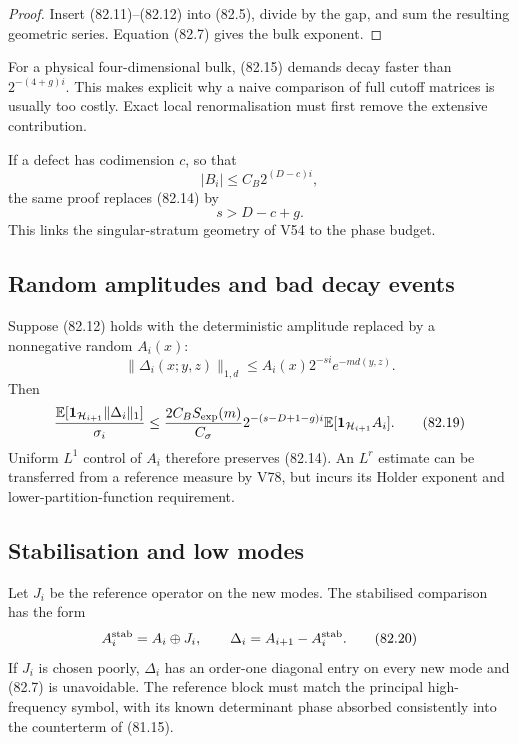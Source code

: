 \documentclass[11pt]{article}
\begin{document}
\begin{proof}
Insert (82.11)--(82.12) into (82.5), divide by the gap, and sum the
resulting geometric series.  Equation (82.7) gives the bulk exponent.
\end{proof}

For a physical four-dimensional bulk, (82.15) demands decay faster
than \(2^{-(4+g)i}\).  This makes explicit why a naive comparison of
full cutoff matrices is usually too costly.  Exact local
renormalisation must first remove the extensive contribution.

If a defect has codimension \(c\), so that
\[
                              |B_i|\le C_B2^{(D-c)i},         \tag{82.16}
\]
the same proof replaces (82.14) by
\[
                              s>D-c+g.                       \tag{82.17}
\]
This links the singular-stratum geometry of V54 to the phase budget.

\subsection{Random amplitudes and bad decay events}

Suppose (82.12) holds with the deterministic amplitude replaced by a
nonnegative random \(A_i(x)\):
\[
 \|\Delta_i(x;y,z)\|_{1,d}
       \le A_i(x)2^{-si}e^{-m d(y,z)}.                       \tag{82.18}
\]
Then
\[
 {\mathbb E[
 {\bf1}_{{\cal H}_{i+1}}\|\Delta_i\|_1]\over\sigma_i}
 \le {2C_BS_{\exp}(m)\over C_\sigma}
       2^{-(s-D+1-g)i}
       \mathbb E[{\bf1}_{{\cal H}_{i+1}}A_i].                \tag{82.19}
\]
Uniform \(L^1\) control of \(A_i\) therefore preserves (82.14).
An \(L^r\) estimate can be transferred from a reference measure by
V78, but incurs its Holder exponent and lower-partition-function
requirement.

\subsection{Stabilisation and low modes}

Let \(J_i\) be the reference operator on the new modes.  The
stabilised comparison has the form
\[
       A_i^{\rm stab}=A_i\oplus J_i,\qquad
       \Delta_i=A_{i+1}-A_i^{\rm stab}.                      \tag{82.20}
\]
If \(J_i\) is chosen poorly, \(\Delta_i\) has an order-one diagonal
entry on every new mode and (82.7) is unavoidable.  The reference
block must match the principal high-frequency symbol, with its
known determinant phase absorbed consistently into the counterterm
of (81.15).
\end{document}
